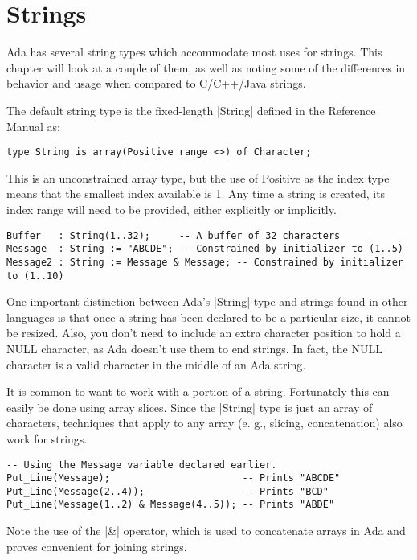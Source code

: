 \section{Strings}

Ada has several string types which accommodate most uses for strings. This chapter will look at
a couple of them, as well as noting some of the differences in behavior and usage when compared
to C/C++/Java strings.

The default string type is the fixed-length |String| defined in the Reference Manual as:

\begin{lstlisting}
type String is array(Positive range <>) of Character;
\end{lstlisting}

\noindent This is an unconstrained array type, but the use of Positive as the index type means
that the smallest index available is 1. Any time a string is created, its index range will need
to be provided, either explicitly or implicitly.

\begin{lstlisting}
Buffer   : String(1..32);     -- A buffer of 32 characters
Message  : String := "ABCDE"; -- Constrained by initializer to (1..5)
Message2 : String := Message & Message; -- Constrained by initializer to (1..10)
\end{lstlisting}

One important distinction between Ada's |String| type and strings found in other languages is
that once a string has been declared to be a particular size, it cannot be resized. Also, you
don't need to include an extra character position to hold a NULL character, as Ada doesn't use
them to end strings. In fact, the NULL character is a valid character in the middle of an Ada
string.

It is common to want to work with a portion of a string. Fortunately this can easily be done
using array slices. Since the |String| type is just an array of characters, techniques that
apply to any array (e. g., slicing, concatenation) also work for strings.

\begin{lstlisting}
-- Using the Message variable declared earlier.
Put_Line(Message);                       -- Prints "ABCDE"
Put_Line(Message(2..4));                 -- Prints "BCD"
Put_Line(Message(1..2) & Message(4..5)); -- Prints "ABDE"
\end{lstlisting}

\noindent Note the use of the |&| operator, which is used to concatenate arrays in Ada and
proves convenient for joining strings.

